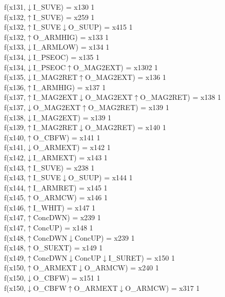 f(x131,$\downarrow$I\_SUVE) = x130 {1} \\
f(x132,$\uparrow$I\_SUVE) = x259 {1} \\
f(x132,$\uparrow$I\_SUVE$\downarrow$O\_SUUP) = x415 {1} \\
f(x132,$\uparrow$O\_ARMHIG) = x133 {1} \\
f(x133,$\downarrow$I\_ARMLOW) = x134 {1} \\
f(x134,$\downarrow$I\_PSEOC) = x135 {1} \\
f(x134,$\downarrow$I\_PSEOC$\uparrow$O\_MAG2EXT) = x1302 {1} \\
f(x135,$\downarrow$I\_MAG2RET$\uparrow$O\_MAG2EXT) = x136 {1} \\
f(x136,$\uparrow$I\_ARMHIG) = x137 {1} \\
f(x137,$\uparrow$I\_MAG2EXT$\downarrow$O\_MAG2EXT$\uparrow$O\_MAG2RET) = x138 {1} \\
f(x137,$\downarrow$O\_MAG2EXT$\uparrow$O\_MAG2RET) = x139 {1} \\
f(x138,$\downarrow$I\_MAG2EXT) = x139 {1} \\
f(x139,$\uparrow$I\_MAG2RET$\downarrow$O\_MAG2RET) = x140 {1} \\
f(x140,$\uparrow$O\_CBFW) = x141 {1} \\
f(x141,$\downarrow$O\_ARMEXT) = x142 {1} \\
f(x142,$\downarrow$I\_ARMEXT) = x143 {1} \\
f(x143,$\uparrow$I\_SUVE) = x238 {1} \\
f(x143,$\uparrow$I\_SUVE$\downarrow$O\_SUUP) = x144 {1} \\
f(x144,$\uparrow$I\_ARMRET) = x145 {1} \\
f(x145,$\uparrow$O\_ARMCW) = x146 {1} \\
f(x146,$\uparrow$I\_WHIT) = x147 {1} \\
f(x147,$\uparrow$ConcDWN) = x239 {1} \\
f(x147,$\uparrow$ConcUP) = x148 {1} \\
f(x148,$\uparrow$ConcDWN$\downarrow$ConcUP) = x239 {1} \\
f(x148,$\uparrow$O\_SUEXT) = x149 {1} \\
f(x149,$\uparrow$ConcDWN$\downarrow$ConcUP$\downarrow$I\_SURET) = x150 {1} \\
f(x150,$\uparrow$O\_ARMEXT$\downarrow$O\_ARMCW) = x240 {1} \\
f(x150,$\downarrow$O\_CBFW) = x151 {1} \\
f(x150,$\downarrow$O\_CBFW$\uparrow$O\_ARMEXT$\downarrow$O\_ARMCW) = x317 {1} \\
